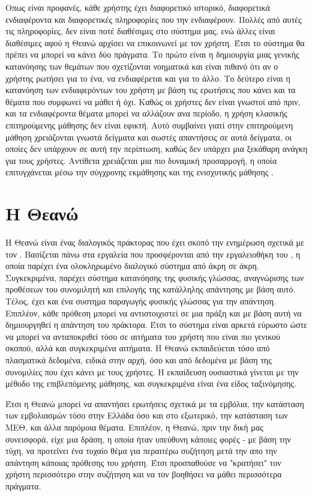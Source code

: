 Οπως είναι προφανές, κάθε χρήστης έχει διαφορετικό ιστορικό, διαφορετικά ενδιαφέροντα και διαφορετικές πληροφορίες που την ενδιαφέρουν. Πολλές από αυτές τις πληροφορίες, δεν είναι ποτέ διαθέσιμες στο σύστημα μας, ενώ άλλες είναι διαθέσιμες αφού η Θεανώ αρχίσει να επικοινωνεί με τον χρήστη. Έτσι το σύστημα θα πρέπει να μπορεί να κάνει δύο πράγματα. Το πρώτο είναι η δημιουργία μιας γενικής κατανόησης των θεμάτων που σχετίζονται νοηματικά και είναι πιθανό ότι αν ο χρήστης ρωτήσει για το ένα, να ενδιαφέρεται και για το άλλο. Το δεύτερο είναι η κατανόηση των ενδιαφερόντων του χρήστη με βάση τις ερωτήσεις που κάνει και τα θέματα που συμφωνεί να μάθει ή όχι. Καθώς οι χρήστες δεν είναι γνωστοί από πριν, και τα ενδιαφέροντα θέματα μπορεί να αλλάζουν ανα περίοδο, η χρήση κλασικής επιτηρούμενης μάθησης δεν είναι εφικτή. Αυτό συμβαίνει γιατί στην επιτηρούμενη μάθηση χρειάζονται γνωστά δείγματα και σωστές απαντήσεις σε αυτά δείγματα, οι οποίες δεν υπάρχουν σε αυτή την περίπτωση, καθώς δεν υπάρχει μια ξεκάθαρη ανάγκη για τους χρήστες. Αντίθετα χρειάζεται μια πιο δυναμική προσαρμογή, η οποία επιτυγχάνεται μέσω την σύγχρονης εκμάθησης  και της ενισχυτικής μάθησης .

\section{Η Θεανώ}

Η Θεανώ είναι ένας διαλογικός πράκτορας που έχει σκοπό την ενημέρωση σχετικά με τον . Βασίζεται πάνω στα εργαλεία που προσφέρονται από την εργαλειοθήκη του , η οποία παρέχει ένα ολοκληρωμένο διαλογικό σύστημα από άκρη σε άκρη. Συγκεκριμένα, παρέχει σύστημα κατανόησης της φυσικής γλώσσας, αναγνώρισης των προθέσεων του συνομιλητή και επιλογής της κατάλληλης απάντησης με βάση αυτό. Τέλος, έχει και ένα συστημα παραγωγής φυσικής γλώσσας για την απάντηση. Επιπλέον, κάθε πρόθεση μπορεί να αντιστοιχιστεί σε μια πράξη και με βάση αυτή να δημιουργηθεί η απάντηση του πράκτορα. Έτσι το σύστημα είναι αρκετά εύρωστο ώστε να μπορεί να ανταποκριθεί τόσο σε αιτήματα του χρήστη που είναι πιο γενικού σκοπού, αλλά και συγκεκριμένα αιτήματα. H Θεανώ εκπαιδεύεται τόσο από πλασματικά δεδομένα, ειδικά στην αρχή, όσο και από δεδομένα με βάση της συνομιλίες που έχει κάνει με τους χρήστες. Η εκπαίδευση ουσιαστικά γίνεται με την μέθοδο της επιβλεπόμενης μάθησης, και συγκεκριμένα είναι ένα είδος ταξινόμησης.

Έτσι η Θεανώ μπορεί να απαντήσει ερωτήσεις σχετικά με τα εμβόλια, την κατάσταση των εμβολιασμών τόσο στην Ελλάδα όσο και στο εξωτερικό, την κατάσταση των ΜΕΘ, και άλλα παρόμοια θέματα. Επιπλέον, η Θεανώ, πριν την δική μας συνεισφορά, είχε μια δράση, η οποία ήταν υπεύθυνη κάποιες φορές - με βάση την τύχη, να προτείνει ένα τυχαίο θέμα για περαιτέρω συζήτηση μετά την απο την απάντηση κάποιας πρόθεσης του χρήστη. Έτσι προσπαθούσε να "κρατήσει" τον χρήστη περισσότερο στην συζήτηση και να τον βοηθήσει να μάθει περισσότερα πράγματα.

